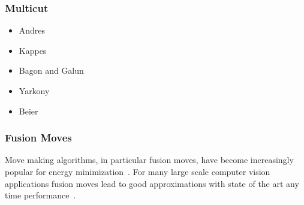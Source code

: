 \documentclass[10pt,twocolumn,letterpaper]{article}
\begin{document}
\subsubsection{Multicut}
   \begin{itemize}
   \item Andres \etal~\cite{andres_2011_iccv}
   \item Kappes \etal~\cite{kappes_2011_emmcvpr}
   \item Bagon and Galun~\cite{bagon_2011_arxiv}
   \item Yarkony \etal~\cite{yarkony_2012_eccv}
   \item Beier \etal~\cite{beier_2014_cvpr}
   \end{itemize}

\subsubsection{Fusion Moves}
Move making algorithms, in particular fusion moves, 
have become increasingly popular for energy minimization~\cite{???,kappes_2014_ws}.
For many large scale computer vision applications fusion moves lead to good approximations
with state of the art any time performance~\cite{kappes_2014_ws}.
\end{document}
